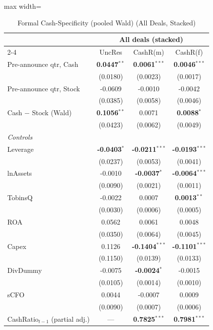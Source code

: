 \begin{table}[htbp]\centering
\caption{Formal Cash-Specificity (pooled Wald) (All Deals, Stacked)}\label{tab:rob_cashspec}
\scriptsize\begin{adjustbox}{max width=\linewidth}\begin{tabular}{lccc}
\toprule
 & \multicolumn{3}{c}{\textbf{All deals (stacked)}} \\
\cmidrule(lr){2-4}
 & UncRes & CashR(m) & CashR(f) \\
\midrule
Pre-announce qtr, Cash & \textbf{0.0447}$^{**}$ & \textbf{0.0061}$^{***}$ & \textbf{0.0046}$^{***}$  \\
 & (0.0180) & (0.0023) & (0.0017)  \\
Pre-announce qtr, Stock & -0.0609 & -0.0010 & -0.0042  \\
 & (0.0385) & (0.0058) & (0.0046)  \\
\midrule
Cash $-$ Stock (Wald) & \textbf{0.1056}$^{**}$ & 0.0071 & \textbf{0.0088}$^{*}$  \\
 & (0.0423) & (0.0062) & (0.0049)  \\
\midrule
\multicolumn{4}{l}{\textit{Controls}} \\
Leverage & \textbf{-0.0403}$^{*}$ & \textbf{-0.0211}$^{***}$ & \textbf{-0.0193}$^{***}$  \\
 & (0.0237) & (0.0053) & (0.0041)  \\
lnAssets & -0.0010 & \textbf{-0.0037}$^{*}$ & \textbf{-0.0064}$^{***}$  \\
 & (0.0090) & (0.0021) & (0.0011)  \\
TobinsQ & -0.0022 & 0.0007 & \textbf{0.0013}$^{**}$  \\
 & (0.0030) & (0.0006) & (0.0005)  \\
ROA & 0.0562 & 0.0061 & 0.0048  \\
 & (0.0350) & (0.0064) & (0.0045)  \\
Capex & 0.1126 & \textbf{-0.1404}$^{***}$ & \textbf{-0.1101}$^{***}$  \\
 & (0.1150) & (0.0139) & (0.0133)  \\
DivDummy & -0.0075 & \textbf{-0.0024}$^{*}$ & -0.0015  \\
 & (0.0105) & (0.0014) & (0.0010)  \\
sCFO & 0.0044 & -0.0007 & 0.0009  \\
 & (0.0090) & (0.0007) & (0.0006)  \\
CashRatio$_{t-1}$ (partial adj.) & --- & \textbf{0.7825}$^{***}$ & \textbf{0.7981}$^{***}$  \\

\end{tabular}
\end{adjustbox}
\end{table}

